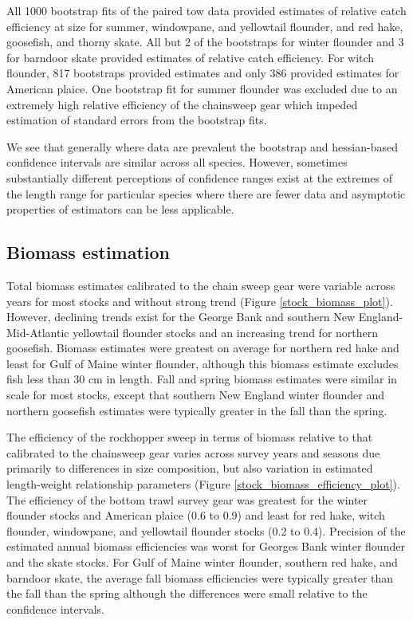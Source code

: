 \documentclass[
  12pt,
]{article}
\begin{document}
All 1000 bootstrap fits of the paired tow data provided estimates of
relative catch efficiency at size for summer, windowpane, and yellowtail
flounder, and red hake, goosefish, and thorny skate. All but 2 of the
bootstraps for winter flounder and 3 for barndoor skate provided
estimates of relative catch efficiency. For witch flounder, 817
bootstraps provided estimates and only 386 provided estimates for
American plaice. One bootstrap fit for summer flounder was excluded due
to an extremely high relative efficiency of the chainsweep gear which
impeded estimation of standard errors from the bootstrap fits.

We see that generally where data are prevalent the bootstrap and
hessian-based confidence intervals are similar across all species.
However, sometimes substantially different perceptions of confidence
ranges exist at the extremes of the length range for particular species
where there are fewer data and asymptotic properties of estimators can
be less applicable.

\hypertarget{biomass-estimation-1}{%
\subsection{Biomass estimation}\label{biomass-estimation-1}}

Total biomass estimates calibrated to the chain sweep gear were variable
across years for most stocks and without strong trend (Figure
\ref{stock_biomass_plot}). However, declining trends exist for the
George Bank and southern New England-Mid-Atlantic yellowtail flounder
stocks and an increasing trend for northern goosefish. Biomass estimates
were greatest on average for northern red hake and least for Gulf of
Maine winter flounder, although this biomass estimate excludes fish less
than 30 cm in length. Fall and spring biomass estimates were similar in
scale for most stocks, except that southern New England winter flounder
and northern goosefish estimates were typically greater in the fall than
the spring.

The efficiency of the rockhopper sweep in terms of biomass relative to
that calibrated to the chainsweep gear varies across survey years and
seasons due primarily to differences in size composition, but also
variation in estimated length-weight relationship parameters (Figure
\ref{stock_biomass_efficiency_plot}). The efficiency of the bottom trawl
survey gear was greatest for the winter flounder stocks and American
plaice (0.6 to 0.9) and least for red hake, witch flounder, windowpane,
and yellowtail flounder stocks (0.2 to 0.4). Precision of the estimated
annual biomass efficiencies was worst for Georges Bank winter flounder
and the skate stocks. For Gulf of Maine winter flounder, southern red
hake, and barndoor skate, the average fall biomass efficiencies were
typically greater than the fall than the spring although the differences
were small relative to the confidence intervals.
\end{document}
